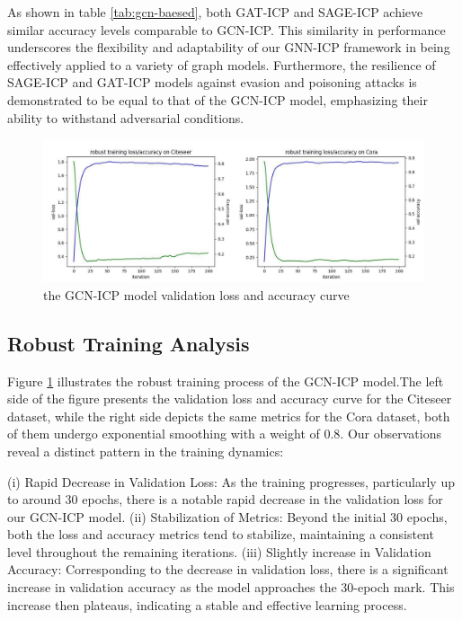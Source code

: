\documentclass[conference]{IEEEtran}
\begin{document}
As shown in table \ref{tab:gcn-baesed}, both GAT-ICP and SAGE-ICP achieve similar accuracy levels comparable to GCN-ICP. This similarity in performance underscores the flexibility and adaptability of our GNN-ICP framework in being effectively applied to a variety of graph models. Furthermore, the resilience of SAGE-ICP and GAT-ICP models against evasion and poisoning attacks is demonstrated to be equal to that of the GCN-ICP model, emphasizing their ability to withstand adversarial conditions.



 \begin{figure}
  \centering
  \includegraphics[width=.5\textwidth]{loss-accuracy.jpg} %
  \caption{the GCN-ICP model validation loss and accuracy curve} %
  \label{loss-accuracy} %
\end{figure}
\subsection{Robust Training Analysis}

Figure \ref{loss-accuracy} illustrates the robust training process of the GCN-ICP model.The left side of the figure presents the validation loss and accuracy curve for the Citeseer dataset, while the right side depicts the same metrics for the Cora dataset, both of them undergo exponential smoothing with a weight of 0.8. Our observations reveal a distinct pattern in the training dynamics:

(i) Rapid Decrease in Validation Loss: As the training progresses, particularly up to around 30 epochs, there is a notable rapid decrease in the validation loss for our GCN-ICP model.
(ii) Stabilization of Metrics: Beyond the initial 30 epochs, both the loss and accuracy metrics tend to stabilize, maintaining a consistent level throughout the remaining iterations.
(iii) Slightly increase in Validation Accuracy: Corresponding to the decrease in validation loss, there is a significant increase in validation accuracy as the model approaches the 30-epoch mark. This increase then plateaus, indicating a stable and effective learning process.
\end{document}
